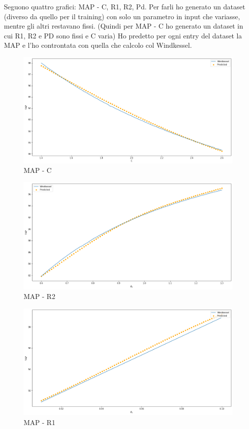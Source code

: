 \newpage
Seguono quattro grafici: MAP - C, R1, R2, Pd. Per farli ho generato un dataset (diverso da quello per il training) con solo un parametro in input che variasse, mentre gli altri restavano fissi. (Quindi per MAP - C ho generato un dataset in cui R1, R2 e PD sono fissi e C varia) Ho predetto per ogni entry del dataset la MAP e l'ho controntata con quella che calcolo col Windkessel.


\begin{figure}[h]
    \centering
    \includegraphics[width=1\textwidth]{images/Training - temp/MAP - C.png}
    \caption{MAP - C}
\end{figure}

\newpage

\begin{figure}[h]
    \centering
    \includegraphics[width=1\textwidth]{images/Training - temp/MAP - R2.png}
    \caption{MAP - R2}
\end{figure}

\newpage

\begin{figure}[h]
    \centering
    \includegraphics[width=1\textwidth]{images/Training - temp/MAP _ R1.png}
    \caption{MAP - R1}
\end{figure}

